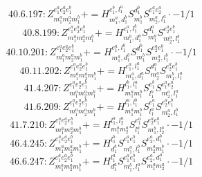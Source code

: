 \documentclass[letterpaper,10pt,fleqn,leqno,onecolumn]{article}
\begin{document}
\begin{equation} \;\;\;\;\;\;  40.6.197: Z^{e_{1}^{a}e_{2}^{a}e_{1}^{b}}_{m_{1}^{a}m_{2}^{a}m_{1}^{b}}+=H^{e_{1}^{b},l_{1}^{a}}_{m_{1}^{a},d_{1}^{b}}S^{d_{1}^{b}}_{m_{1}^{b}}S^{e_{1}^{a}e_{2}^{a}}_{m_{2}^{a},l_{1}^{a}}\cdot -1/1 \end{equation}
\begin{equation} \;\;\;\;\;\;  40.8.199: Z^{e_{1}^{a}e_{2}^{a}e_{1}^{b}}_{m_{1}^{a}m_{2}^{a}m_{1}^{b}}+=H^{e_{1}^{a},l_{1}^{b}}_{m_{1}^{b},d_{1}^{a}}S^{d_{1}^{a}}_{m_{1}^{a}}S^{e_{2}^{a}e_{1}^{b}}_{m_{2}^{a},l_{1}^{b}} \end{equation}
\begin{equation} \;\;\;\;\;\;  40.10.201: Z^{e_{1}^{a}e_{2}^{a}e_{1}^{b}}_{m_{1}^{a}m_{2}^{a}m_{1}^{b}}+=H^{e_{1}^{a},l_{1}^{b}}_{m_{1}^{a},d_{1}^{b}}S^{d_{1}^{b}}_{m_{1}^{b}}S^{e_{2}^{a}e_{1}^{b}}_{m_{2}^{a},l_{1}^{b}}\cdot -1/1 \end{equation}
\begin{equation} \;\;\;\;\;\;  40.11.202: Z^{e_{1}^{a}e_{2}^{a}e_{1}^{b}}_{m_{1}^{a}m_{2}^{a}m_{1}^{b}}+=H^{e_{1}^{a},l_{1}^{a}}_{m_{1}^{a},d_{1}^{a}}S^{d_{1}^{a}}_{m_{2}^{a}}S^{e_{2}^{a}e_{1}^{b}}_{m_{1}^{b},l_{1}^{a}} \end{equation}
\begin{equation} \;\;\;\;\;\;  41.4.207: Z^{e_{1}^{a}e_{2}^{a}e_{1}^{b}}_{m_{1}^{a}m_{2}^{a}m_{1}^{b}}+=H^{l_{1}^{b},l_{1}^{a}}_{m_{1}^{a}m_{1}^{b}}S^{e_{1}^{b}}_{l_{1}^{b}}S^{e_{1}^{a}e_{2}^{a}}_{m_{2}^{a},l_{1}^{a}} \end{equation}
\begin{equation} \;\;\;\;\;\;  41.6.209: Z^{e_{1}^{a}e_{2}^{a}e_{1}^{b}}_{m_{1}^{a}m_{2}^{a}m_{1}^{b}}+=H^{l_{1}^{a},l_{1}^{b}}_{m_{1}^{a}m_{1}^{b}}S^{e_{1}^{a}}_{l_{1}^{a}}S^{e_{2}^{a}e_{1}^{b}}_{m_{2}^{a},l_{1}^{b}} \end{equation}
\begin{equation} \;\;\;\;\;\;  41.7.210: Z^{e_{1}^{a}e_{2}^{a}e_{1}^{b}}_{m_{1}^{a}m_{2}^{a}m_{1}^{b}}+=H^{l_{1}^{a},l_{2}^{a}}_{m_{1}^{a}m_{2}^{a}}S^{e_{1}^{a}}_{l_{1}^{a}}S^{e_{2}^{a}e_{1}^{b}}_{m_{1}^{b},l_{2}^{a}}\cdot -1/1 \end{equation}
\begin{equation} \;\;\;\;\;\;  46.4.245: Z^{e_{1}^{a}e_{2}^{a}e_{1}^{b}}_{m_{1}^{a}m_{2}^{a}m_{1}^{b}}+=H^{l_{1}^{b}}_{d_{1}^{b}}S^{e_{1}^{a}e_{1}^{b}}_{m_{1}^{a},l_{1}^{b}}S^{e_{2}^{a},d_{1}^{b}}_{m_{2}^{a}m_{1}^{b}}\cdot -1/1 \end{equation}
\begin{equation} \;\;\;\;\;\;  46.6.247: Z^{e_{1}^{a}e_{2}^{a}e_{1}^{b}}_{m_{1}^{a}m_{2}^{a}m_{1}^{b}}+=H^{l_{1}^{a}}_{d_{1}^{a}}S^{e_{1}^{a}e_{1}^{b}}_{m_{1}^{b},l_{1}^{a}}S^{e_{2}^{a},d_{1}^{a}}_{m_{1}^{a}m_{2}^{a}}\cdot -1/1 \end{equation}
\end{document}

